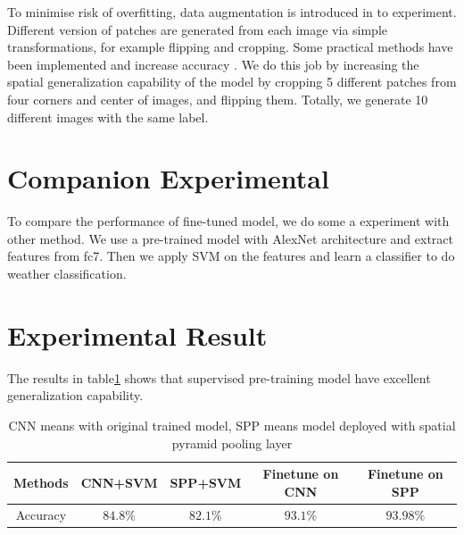 To minimise risk of overfitting, data augmentation is introduced in to experiment. Different version of patches are generated from each image via simple transformations, for example flipping and cropping. Some practical methods have been implemented and increase accuracy \citep{krizhevsky2012imagenet}. We do this job by increasing the spatial generalization capability of the model  by cropping 5 different patches from four corners and center of images, and flipping them. Totally, we generate 10 different images with the same label.

\section{Companion Experimental}

To compare the performance of fine-tuned model, we do some a experiment with other method. We use a pre-trained model with AlexNet architecture and extract features from fc7. Then we apply SVM on the features and learn a classifier to do weather classification.

\section{Experimental Result}

The results in table\ref{ExpRes} shows that supervised pre-training model have excellent generalization capability. 

\begin{table}[h]
\begin{center}
    \begin{tabular}{| c | c | c | c | c |}
    \hline
    Methods & CNN+SVM & SPP+SVM & Finetune on CNN & Finetune on SPP  \\ \hline
    Accuracy & $84.8\%$ & $82.1\%$ & $93.1\%$ & $93.98\%$ \\ \hline
    \end{tabular}
    \caption{CNN means with original trained model, SPP means model deployed with spatial pyramid pooling layer}
    \label{ExpRes}
\end{center}
\end{table}

